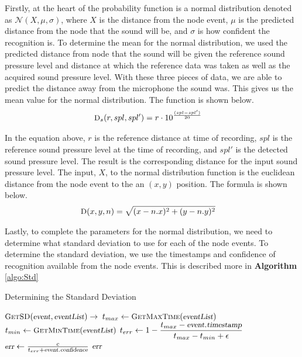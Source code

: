 \documentclass[12pt]{article}
\newcommand{\Normal}[3]{\mathcal{N}(#1, #2, #3)}
\newcommand{\Function}[1]{\ensuremath{{\small \textsc{#1}}}}
\newcommand{\Var}[1]{\ensuremath{{\small{\textsl{#1}}}}}
\begin{document}
Firstly, at the heart of the probability function is a normal distribution
denoted as $\Normal{X}{\mu}{\sigma}$, where $X$ is the distance from the node
event, $\mu$ is the predicted distance from the node that the sound will be,
and $\sigma$ is how confident the recognition is. To determine the mean for the
normal distribution, we used the predicted distance from node that the sound
will be given the reference sound pressure level and distance at which the
reference data was taken as well as the acquired sound pressure level. With
these three pieces of data, we are able to predict the distance away from the
microphone the sound was. This gives us the mean value for the normal
distribution. The function is shown below.  \begin{align*}
\Function{D}_{s}(r, spl, spl') &= r \cdot 10 ^ {\frac{(spl - spl')}{20}}
\end{align*}

In the equation above, $r$ is the reference distance at time of recording,
$spl$ is the reference sound pressure level at the time of recording, and
$spl'$ is the detected sound pressure level. The result is the corresponding
distance for the input sound pressure level. The input, $X$, to the normal
distribution function is the euclidean distance from the node event to the an
$(x, y)$ position. The formula is shown below.  \begin{align*}
\Function{D}(x, y, n) &= \sqrt{(x - n.x) ^ 2 + (y - n.y) ^ 2} \end{align*}

Lastly, to complete the parameters for the normal distribution, we need to
determine what standard deviation to use for each of the node events. To
determine the standard deviation, we use the timestamps and confidence of
recognition available from the node events. This is described more in
\textbf{Algorithm} \ref{algo:Std}

\begin{algorithm}[ht] \caption{Determining the Standard Deviation}
\label{algo:Std} \begin{algorithmic}[1] \setcounter{ALC@line}{0}

\vspace*{1mm}

\STATE $\Function{GetSD}(\Var{event}, \Var{eventList}) \rightarrow$
\STATE $t_{max} \leftarrow \Function{GetMaxTime}(\Var{eventList})$
\STATE $t_{min} \leftarrow \Function{GetMinTime}(\Var{eventList})$
\STATE $t_{err} \leftarrow 1 - \mathlarger{\frac{t_{max} - \Var{event}.\Var{timestamp}}{t_{max} - t_{min} + \epsilon}}$
\STATE $\Var{err} \leftarrow \frac{c}{t_{err} + \Var{event}.\Var{confidence}}$
\RETURN $\Var{err}$

\end{algorithmic}
\end{algorithm}
\end{document}
